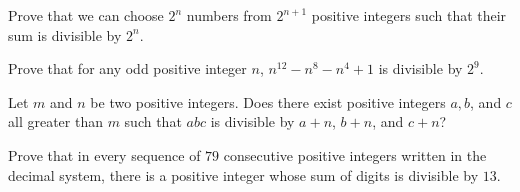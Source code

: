 \begin{problem}
	Prove that we can choose $2^n$ numbers from $2^{n+1}$ positive integers such that their sum is divisible by $2^n$. %
\end{problem}

\begin{problem}
	Prove that for any odd positive integer $n$, $n^{12}-n^8-n^4+1$ is divisible by $2^9$. %
\end{problem}


\begin{problem}
	Let $m$ and $n$ be two positive integers. Does there exist positive integers $a,b$, and $c$ all greater than $m$ such that $abc$ is divisible by $a+n$, $b+n$, and $c+n$? %
\end{problem}

%
%
%

\begin{problem}
	Prove that in every sequence of $79$ consecutive positive integers written in the decimal system, there is a positive integer whose sum of digits is divisible by $13$. %
\end{problem}

